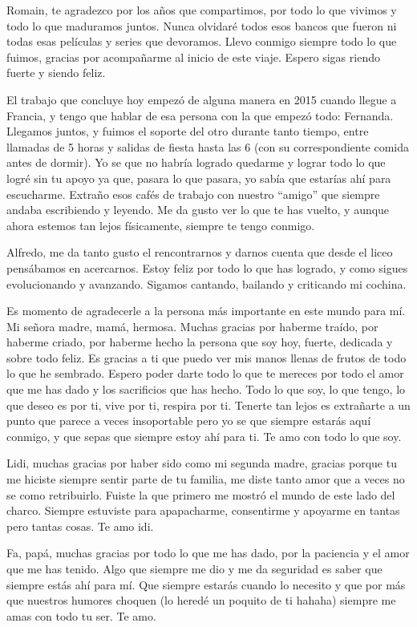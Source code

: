 Romain, te agradezco por los años que compartimos, por todo lo que vivimos y todo lo que maduramos juntos. Nunca olvidaré todos esos bancos que fueron ni todas esas películas y series que devoramos. Llevo conmigo siempre todo lo que fuimos, gracias por acompañarme al inicio de este viaje. Espero sigas riendo fuerte y siendo feliz.

El trabajo que concluye hoy empezó de alguna manera en 2015 cuando llegue a Francia, y tengo que hablar de esa persona con la que empezó todo: Fernanda. Llegamos juntos, y fuimos el soporte del otro durante tanto tiempo, entre llamadas de 5 horas y salidas de fiesta hasta las 6 (con su correspondiente comida antes de dormir). Yo se que no habría logrado quedarme y lograr todo lo que logré sin tu apoyo ya que, pasara lo que pasara, yo sabía que estarías ahí para escucharme. Extraño esos cafés de trabajo con nuestro “amigo” que siempre andaba escribiendo y leyendo. Me da gusto ver lo que te has vuelto, y aunque ahora estemos tan lejos físicamente, siempre te tengo conmigo. 

Alfredo, me da tanto gusto el rencontrarnos y darnos cuenta que desde el liceo pensábamos en acercarnos. Estoy feliz por todo lo que has logrado, y como sigues evolucionando y avanzando. Sigamos cantando, bailando y criticando mi cochina.

\vspace{5mm}
Es momento de agradecerle a la persona más importante en este mundo para mí. Mi señora madre, mamá, hermosa. Muchas gracias por haberme traído, por haberme criado, por haberme hecho la persona que soy hoy, fuerte, dedicada y sobre todo feliz. Es gracias a ti que puedo ver mis manos llenas de frutos de todo lo que he sembrado. Espero poder darte todo lo que te mereces por todo el amor que me has dado y los sacrificios que has hecho. Todo lo que soy, lo que tengo, lo que deseo es por ti, vive por ti, respira por ti. Tenerte tan lejos es extrañarte a un punto que parece a veces insoportable pero yo se que siempre estarás aquí conmigo, y que sepas que siempre estoy ahí para ti. Te amo con todo lo que soy.

Lidi, muchas gracias por haber sido como mi segunda madre, gracias porque tu me hiciste siempre sentir parte de tu familia, me diste tanto amor que a veces no se como retribuirlo. Fuiste la que primero me mostró el mundo de este lado del charco. Siempre estuviste para apapacharme, consentirme y apoyarme en tantas pero tantas cosas. Te amo idi.

Fa, papá, muchas gracias por todo lo que me has dado, por la paciencia y el amor que me has tenido. Algo que siempre me dio y me da seguridad es saber que siempre estás ahí para mí. Que siempre estarás cuando lo necesito y que por más que nuestros humores choquen (lo heredé un poquito de ti hahaha) siempre me amas con todo tu ser. Te amo.

